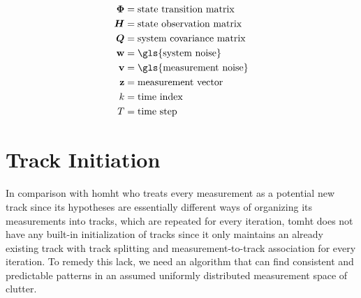 \begin{equation*}
\begin{split}
\M{\Phi} 	&= \text{state transition matrix} \\
\M{H}		&= \text{state observation matrix} \\
\M{Q}		&= \text{system covariance matrix} \\
\V{w}		&= \text{\gls{system noise}} \\
\V{v}		&= \text{\gls{measurement noise}} \\
\V{z}		&= \text{measurement vector} \\
k 			&= \text{time index} \\
T  			&= \text{time step} \\
\end{split}
\end{equation*}

\section{Track Initiation}
In comparison with \gls{homht} who treats every measurement as a potential new track since its hypotheses are essentially different ways of organizing its measurements into tracks, which are repeated for every iteration, \gls{tomht} does not have any built-in initialization of tracks since it only maintains an already existing track with track splitting and measurement-to-track association for every iteration. To remedy this lack, we need an algorithm that can find consistent and predictable patterns in an assumed uniformly distributed measurement space of clutter. 

